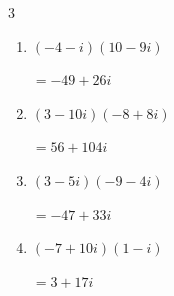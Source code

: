 \begin{multicols}{3}
\begin{enumerate}
        $\displaystyle =-22-63i$

  \item $\displaystyle (-4-i)(10-9i)$

        $\displaystyle =-49+26i$

  \item $\displaystyle (3-10i)(-8+8i)$

        $\displaystyle =56+104i$

  \item $\displaystyle (3-5i)(-9-4i)$

        $\displaystyle =-47+33i$

  \item $\displaystyle (-7+10i)(1-i)$

        $\displaystyle =3+17i$

\end{enumerate}
\end{multicols}
